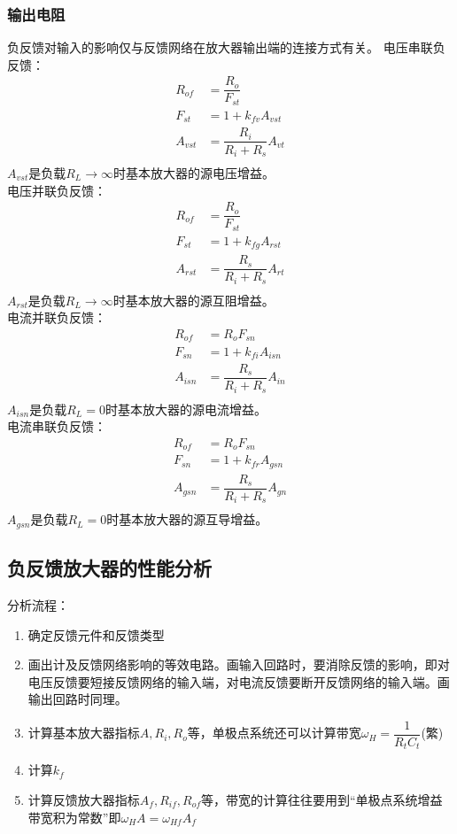 \documentclass{ctexart}
\begin{document}
\subsubsection{输出电阻}
负反馈对输入的影响仅与反馈网络在放大器输出端的连接方式有关。
电压串联负反馈：
\begin{align}
    R_{of}&=\dfrac{R_o}{F_{st}}\\
    F_{st}&=1+k_{fv}A_{vst}\\
    A_{vst}&=\dfrac{R_i}{R_i+R_s}A_{vt}\\
\end{align}
$A_{vst}$是负载$R_L\rightarrow\infty $时基本放大器的源电压增益。\\
电压并联负反馈：
\begin{align}
    R_{of}&=\dfrac{R_o}{F_{st}}\\
    F_{st}&=1+k_{fg}A_{rst}\\
    A_{rst}&=\dfrac{R_s}{R_i+R_s}A_{rt}\\
\end{align}
$A_{rst}$是负载$R_L\rightarrow\infty $时基本放大器的源互阻增益。{\color{blue}{算电压反馈输出电阻时，都要把负载开路}}\\
电流并联负反馈：
\begin{align}
    R_{of}&=R_o F_{sn}\\
    F_{sn}&=1+k_{fi}A_{isn}\\
    A_{isn}&=\dfrac{R_s}{R_i+R_s}A_{in}\\
\end{align}
$A_{isn}$是负载$R_L=0$时基本放大器的源电流增益。\\
电流串联负反馈：
\begin{align}
    R_{of}&=R_o F_{sn}\\
    F_{sn}&=1+k_{fr}A_{gsn}\\
    A_{gsn}&=\dfrac{R_s}{R_i+R_s}A_{gn}\\
\end{align}
$A_{gsn}$是负载$R_L=0$时基本放大器的源互导增益。
\subsection{负反馈放大器的性能分析}
分析流程：
\begin{enumerate}
    \item 确定反馈元件和反馈类型
    \item 画出计及反馈网络影响的等效电路。画输入回路时，要消除反馈的影响，即对电压反馈要短接反馈网络的输入端，对电流反馈要断开反馈网络的输入端。画输出回路时同理。
    \item 计算基本放大器指标$A,R_i,R_o$等，单极点系统还可以计算带宽$\omega_H=\dfrac{1}{R_t C_t}$(繁)
    \item {\color{blue}{借用基本放大器的输出回路}}计算$k_f$
    \item 计算反馈放大器指标$A_f,R_{if},R_{of}$等，带宽的计算往往要用到“单极点系统增益带宽积为常数”即$\omega_H A=\omega_{Hf}A_{f}$
\end{enumerate}
\end{document}
